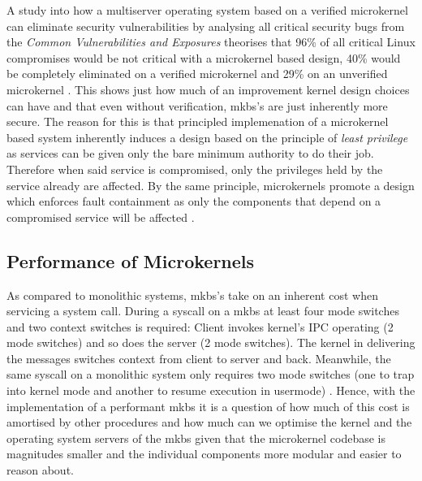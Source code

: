 \documentclass[literature_review.tex]{subfiles}
\begin{document}
A study into how a multiserver operating system based on a verified microkernel can eliminate security vulnerabilities by analysing all critical security bugs from the \textit{Common Vulnerabilities and Exposures} theorises that 96\% of all critical Linux compromises would be not critical with a microkernel based design, 40\% would be completely eliminated on a verified microkernel and 29\% on an unverified microkernel \citep{Biggs_LH_18}. This shows just how much of an improvement kernel design choices can have and that even without verification, \gls{mkbs}'s are just inherently more secure. The reason for this is that principled implemenation of a microkernel based system inherently induces a design based on the principle of \textit{least privilege} \citep{Saltzer_Schroeder_75} as services can be given only the bare minimum authority to do their job. Therefore when said service is compromised, only the privileges held by the service already are affected. By the same principle, microkernels promote a design which enforces fault containment as only the components that depend on a compromised service will be affected \citep{Biggs_LH_18}.

\subsection{Performance of Microkernels}
As compared to monolithic systems, \gls{mkbs}'s take on an inherent cost when servicing a system call. During a syscall on a \gls{mkbs} at least four mode switches and two context switches is required: Client invokes kernel's IPC operating (2 mode switches) and so does the server (2 mode switches). The kernel in delivering the messages switches context from client to server and back. Meanwhile, the same syscall on a monolithic system only requires two mode switches (one to trap into kernel mode and another to resume execution in usermode) \citep{Biggs_LH_18}. Hence, with the implementation of a performant \gls{mkbs} it is a question of how much of this cost is amortised by other procedures and how much can we optimise the kernel and the operating system servers of the \gls{mkbs} given that the microkernel codebase is magnitudes smaller and the individual components more modular and easier to reason about.
\end{document}
